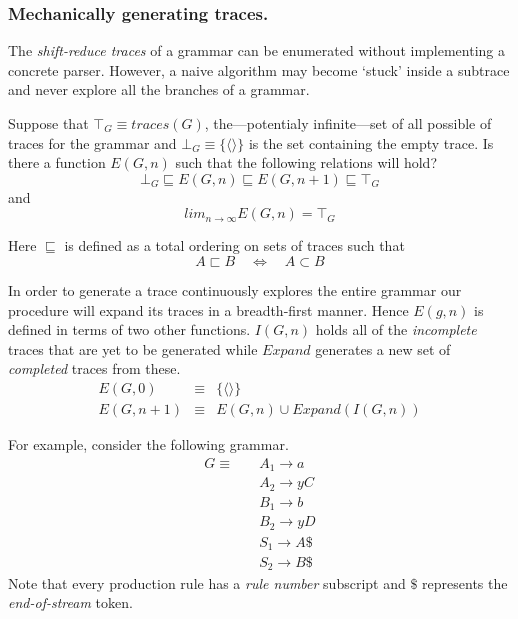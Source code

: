 \documentclass[envcountsame,runningheads]{llncs}
\begin{document}

\subsubsection{Mechanically generating traces.}

The \emph{shift-reduce traces} of a grammar can be enumerated without implementing a concrete parser.
However, a naive algorithm may become `stuck' inside a subtrace and never explore all the branches of a grammar.

Suppose that $\top_{G} \equiv traces(G)$, the---potentialy infinite---set of all possible of traces for the grammar and $\bot_{G} \equiv \{ \langle \rangle \}$ is the set containing the empty trace.
Is there a function $E(G,n)$ such that the following relations will hold?
\begin{equation} \bot_{G} \sqsubseteq E(G, n) \sqsubseteq E(G, n+1) \sqsubseteq \top_{G} \end{equation}
and
\begin{equation} lim_{n \to \infty} E(G,n) = \top_{G} \end{equation}

Here $\sqsubseteq$ is defined as a total ordering on sets of traces such that
\begin{equation} A \sqsubset B \quad \Longleftrightarrow \quad A \subset B\end{equation}

In order to generate a trace continuously explores the entire grammar our procedure will expand its traces in a breadth-first manner.
Hence $E(g,n)$ is defined in terms of two other functions. $I(G,n)$ holds all of the \emph{incomplete} traces that are yet to be generated while $Expand$ generates a new set of \emph{completed} traces from these.
\begin{eqnarray}
E(G, 0)   & \equiv & \{ \langle \rangle \} \\
E(G, n+1) & \equiv & E(G, n) \cup Expand(I(G, n))
\end{eqnarray}

For example, consider the following grammar.
{\small\begin{align*}
G \equiv \quad & A_1 \rightarrow a\\
               & A_2 \rightarrow y C\\
               & B_1 \rightarrow b\\
               & B_2 \rightarrow y D\\
               & S_1 \rightarrow A \$\\
               & S_2 \rightarrow B \$
\end{align*}}
Note that every production rule has a \emph{rule number} subscript and $\$$ represents the \emph{end-of-stream} token.
\end{document}
